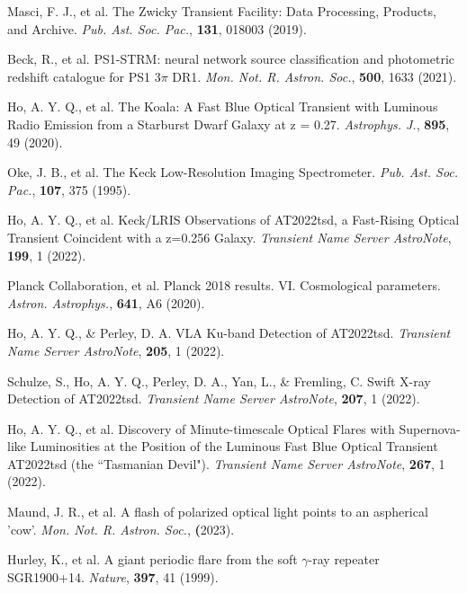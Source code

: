 \documentclass{nature_plusfigure}
\newcommand{\mn}{{Mon. Not. R. Astron. Soc.}}
\newcommand{\mnras}{\mn}
\newcommand{\apj}{{Astrophys. J.}}
\newcommand{\aap}{{Astron. Astrophys.}}
\newcommand{\nat}{{Nature}}
\newcommand{\pasp}{{Pub. Ast. Soc. Pac.}}
\begin{document}
\begin{thebibliography}{100}
 Masci, F. J., et al. The Zwicky Transient Facility: Data Processing, Products, and Archive. \emph{\pasp}, \textbf{131}, 018003 (2019). 

 Beck, R., et al. PS1-STRM: neural network source classification and photometric redshift catalogue for PS1 3$\pi$ DR1. \emph{\mnras}, \textbf{500}, 1633 (2021). 

 Ho, A. Y. Q., et al. The Koala: A Fast Blue Optical Transient with Luminous Radio Emission from a Starburst Dwarf Galaxy at z = 0.27. \emph{\apj}, \textbf{895}, 49 (2020). 

 Oke, J. B., et al. The Keck Low-Resolution Imaging Spectrometer. \emph{\pasp}, \textbf{107}, 375 (1995). 

 Ho, A. Y. Q., et al. Keck/LRIS Observations of AT2022tsd, a Fast-Rising Optical Transient Coincident with a z=0.256 Galaxy. \emph{Transient Name Server AstroNote}, \textbf{199}, 1 (2022). 

 Planck Collaboration, et al. Planck 2018 results. VI. Cosmological parameters. \emph{\aap}, \textbf{641}, A6 (2020). 

 Ho, A. Y. Q., \& Perley, D. A. VLA Ku-band Detection of AT2022tsd. \emph{Transient Name Server AstroNote}, \textbf{205}, 1 (2022). 

 Schulze, S., Ho, A. Y. Q., Perley, D. A., Yan, L., \& Fremling, C. Swift X-ray Detection of AT2022tsd. \emph{Transient Name Server AstroNote}, \textbf{207}, 1 (2022). 

 Ho, A. Y. Q., et al. Discovery of Minute-timescale Optical Flares with Supernova-like Luminosities at the Position of the Luminous Fast Blue Optical Transient AT2022tsd (the ``Tasmanian Devil"). \emph{Transient Name Server AstroNote}, \textbf{267}, 1 (2022). 

 Maund, J. R., et al. A flash of polarized optical light points to an aspherical 'cow'. \emph{\mnras}, \textbf (2023). 

 Hurley, K., et al. A giant periodic flare from the soft $\gamma$-ray repeater SGR1900+14. \emph{\nat}, \textbf{397}, 41 (1999). 



\end{thebibliography}
\end{document}
